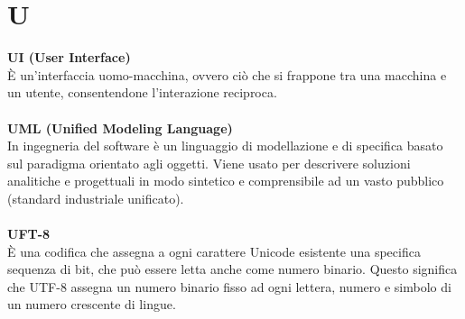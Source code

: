 \section{U}
\textbf{UI (User Interface)}\\
È un'interfaccia uomo-macchina, ovvero ciò che si frappone tra una macchina e un utente, consentendone l'interazione reciproca. \\ \\
\textbf{UML (Unified Modeling Language)}\\
In ingegneria del software è un linguaggio di modellazione e di specifica basato sul paradigma orientato agli oggetti. Viene usato per descrivere soluzioni analitiche e progettuali in modo sintetico e comprensibile ad un vasto pubblico (standard industriale unificato). \\ \\
\textbf{UFT-8}\\
È una codifica che assegna a ogni carattere Unicode esistente una specifica sequenza di bit, che può essere letta anche come numero binario. Questo significa che UTF-8 assegna un numero binario fisso ad ogni lettera, numero e simbolo di un numero crescente di lingue. \\ \\
\clearpage